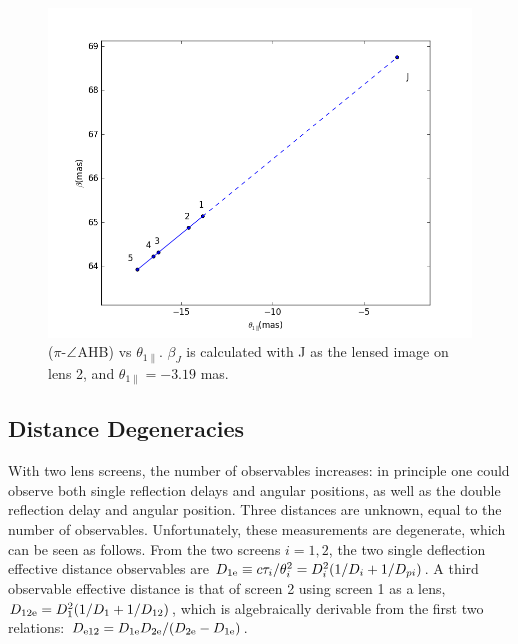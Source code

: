 \documentclass[useAMS,usenatbib]{mn2e}
\begin{document}
\begin{figure}
\centering
\includegraphics[width=1.0\linewidth]{Reflection_angle.png}
\caption{  ($\pi$-$\protect\angle$AHB) vs $\theta_{1\parallel}$.
$\beta_J$ is calculated with J as the lensed image on lens 2, and $\theta_{1\parallel}=-3.19$ mas.}
\label{vtrans}
\end{figure}

\subsection{Distance Degeneracies}
\label{sec:degeneracy}
With two lens screens, the number of observables increases: in
principle one could observe both single reflection delays and angular
positions, as well as the double reflection delay and angular
position.  Three distances are unknown, equal to the number of
observables.  Unfortunately, these measurements are degenerate, which
can be seen as follows. From the two screens $i=1,2$, the two single
deflection effective distance observables are
$D_{1{\rm e}} \equiv c\tau_i/\theta_i^2=D_i^2(1/D_i+1/D_{pi})$.  A third
observable effective distance is that of screen 2 using screen 1 as a
lens, $D_{12{\rm e}}=D_1^2(1/D_1+1/D_{12})$, which is algebraically
derivable from the first two relations:
$D_{{\rm e}{12}}=D_{1{\rm e}}D_{2{\rm e}}/(D_{2{\rm e}}-D_{1{\rm e}})$.  

\end{document}
